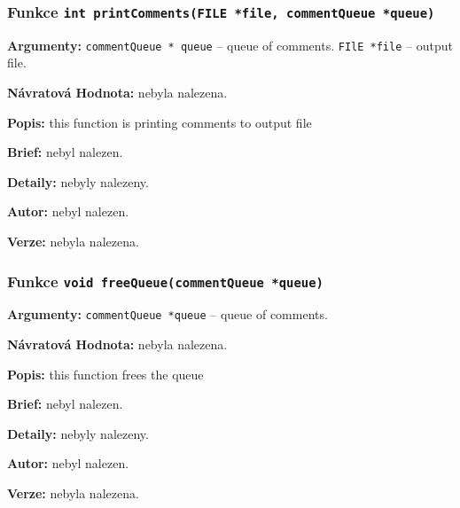 \documentclass[12pt, a4paper]{article}
\begin{document}
\subsubsection{Funkce \texttt{int printComments(FILE *file, commentQueue *queue)}}
\textbf{Argumenty: }\verb"commentQueue * queue" -- queue of comments. \verb"FIlE *file" -- output file. \\
\par\noindent
\textbf{Návratová Hodnota: }nebyla nalezena.\\
\par\noindent
\textbf{Popis: }this function is printing comments to output file\\
\par\noindent
\textbf{Brief: }nebyl nalezen.\\
\par\noindent
\textbf{Detaily: }nebyly nalezeny.\\
\par\noindent
\textbf{Autor: }nebyl nalezen.\\
\par\noindent
\textbf{Verze: }nebyla nalezena.\\
\par\noindent
\subsubsection{Funkce \texttt{void freeQueue(commentQueue *queue)}}
\textbf{Argumenty: }\verb"commentQueue *queue" -- queue of comments. \\
\par\noindent
\textbf{Návratová Hodnota: }nebyla nalezena.\\
\par\noindent
\textbf{Popis: }this function frees the queue\\
\par\noindent
\textbf{Brief: }nebyl nalezen.\\
\par\noindent
\textbf{Detaily: }nebyly nalezeny.\\
\par\noindent
\textbf{Autor: }nebyl nalezen.\\
\par\noindent
\textbf{Verze: }nebyla nalezena.\\
\par\noindent
\end{document}
